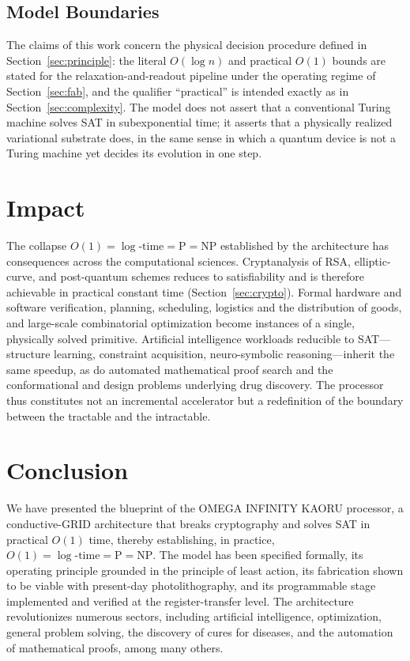 \documentclass[letterpaper,journal]{IEEEtran}
\begin{document}
\subsection{Model Boundaries}
The claims of this work concern the physical decision procedure defined
in Section~\ref{sec:principle}: the literal $O(\log n)$ and practical
$O(1)$ bounds are stated for the relaxation-and-readout pipeline under
the operating regime of Section~\ref{sec:fab}, and the qualifier
``practical'' is intended exactly as in Section~\ref{sec:complexity}.
The model does not assert that a conventional Turing machine solves SAT
in subexponential time; it asserts that a physically realized
variational substrate does, in the same sense in which a quantum device
is not a Turing machine yet decides its evolution in one step.

\section{Impact}
\label{sec:impact}

The collapse $O(1)=\log\text{-time}=\text{P}=\text{NP}$ established by the
architecture has consequences across the computational sciences.
Cryptanalysis of RSA, elliptic-curve, and post-quantum schemes reduces to
satisfiability and is therefore achievable in practical constant time
(Section~\ref{sec:crypto}). Formal hardware and software verification,
planning, scheduling, logistics and the distribution of goods, and
large-scale combinatorial optimization become instances of a single,
physically solved primitive. Artificial intelligence workloads reducible to
SAT---structure learning, constraint acquisition, neuro-symbolic
reasoning---inherit the same speedup, as do automated mathematical proof
search and the conformational and design problems underlying drug
discovery. The processor thus constitutes not an incremental accelerator
but a redefinition of the boundary between the tractable and the
intractable.

\section{Conclusion}
\label{sec:conclusion}

We have presented the blueprint of the OMEGA INFINITY KAORU processor, a
conductive-GRID architecture that breaks cryptography and solves SAT in
practical $O(1)$ time, thereby establishing, in practice,
$O(1)=\log\text{-time}=\text{P}=\text{NP}$. The model has been specified
formally, its operating principle grounded in the principle of least
action, its fabrication shown to be viable with present-day
photolithography, and its programmable stage implemented and verified at
the register-transfer level. The architecture revolutionizes numerous
sectors, including artificial intelligence, optimization, general
problem solving, the discovery of cures for diseases, and the automation of
mathematical proofs, among many others.
\end{document}
